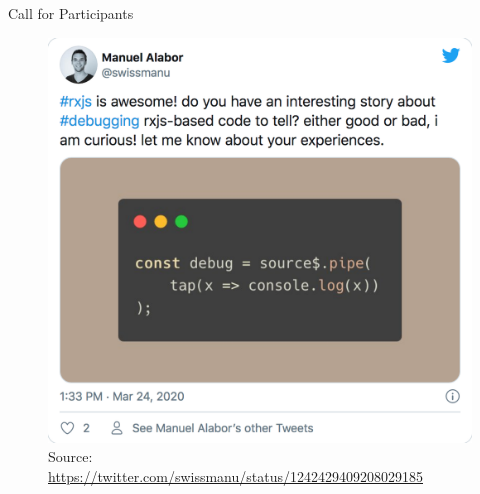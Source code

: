 \documentclass[aspectratio=169]{beamer}
\begin{document}
\begin{frame}[fragile]{Call for Participants}
    \begin{figure}[H]
        \centering
        \includegraphics[height=0.6\textheight]{figures/tweet-interview.png}
        \caption{\tiny{Source: \url{https://twitter.com/swissmanu/status/1242429409208029185}}}
    \end{figure}
\end{frame}

\end{document}
